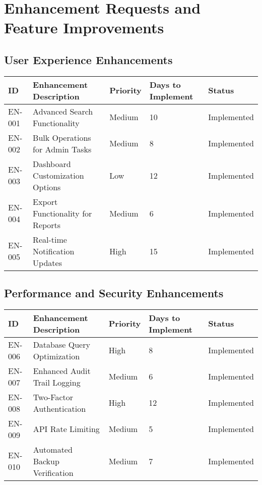 \documentclass[12pt,a4paper]{article}
\begin{document}
\section{Enhancement Requests and Feature Improvements}

\subsection{User Experience Enhancements}

\begin{longtable}{|p{1cm}|p{5cm}|p{2cm}|p{2cm}|p{2cm}|}
\hline
\textbf{ID} & \textbf{Enhancement Description} & \textbf{Priority} & \textbf{Days to Implement} & \textbf{Status} \\
\hline
EN-001 & Advanced Search Functionality & Medium & 10 & \cellcolor{green!30}Implemented \\
\hline
EN-002 & Bulk Operations for Admin Tasks & Medium & 8 & \cellcolor{green!30}Implemented \\
\hline
EN-003 & Dashboard Customization Options & Low & 12 & \cellcolor{green!30}Implemented \\
\hline
EN-004 & Export Functionality for Reports & Medium & 6 & \cellcolor{green!30}Implemented \\
\hline
EN-005 & Real-time Notification Updates & High & 15 & \cellcolor{green!30}Implemented \\
\hline
\end{longtable}

\subsection{Performance and Security Enhancements}

\begin{longtable}{|p{1cm}|p{5cm}|p{2cm}|p{2cm}|p{2cm}|}
\hline
\textbf{ID} & \textbf{Enhancement Description} & \textbf{Priority} & \textbf{Days to Implement} & \textbf{Status} \\
\hline
EN-006 & Database Query Optimization & High & 8 & \cellcolor{green!30}Implemented \\
\hline
EN-007 & Enhanced Audit Trail Logging & Medium & 6 & \cellcolor{green!30}Implemented \\
\hline
EN-008 & Two-Factor Authentication & High & 12 & \cellcolor{green!30}Implemented \\
\hline
EN-009 & API Rate Limiting & Medium & 5 & \cellcolor{green!30}Implemented \\
\hline
EN-010 & Automated Backup Verification & Medium & 7 & \cellcolor{green!30}Implemented \\
\hline
\end{longtable}
\end{document}
